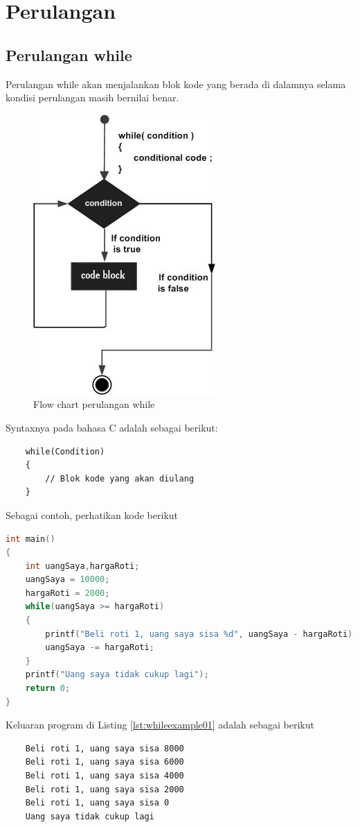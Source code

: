 \section{Perulangan}
\subsection{Perulangan while}
Perulangan while akan menjalankan blok kode yang berada di dalamnya selama kondisi perulangan masih bernilai benar.


\begin{figure}[H]
	\centering
	\includegraphics[width=0.4\linewidth]{P2/img/whileloop.png}
	\caption{Flow chart perulangan while}
	\label{fig:whileloop}
\end{figure}

Syntaxnya pada bahasa C adalah sebagai berikut:
\begin{verbatim}
    while(Condition)
    {
        // Blok kode yang akan diulang
    }
\end{verbatim}

Sebagai contoh, perhatikan kode berikut
\begin{lstlisting}[language=c,caption = Contoh Penggunaan while,label=lst:whileexample01]
int main()
{
	int uangSaya,hargaRoti;
	uangSaya = 10000;
	hargaRoti = 2000;
	while(uangSaya >= hargaRoti)
	{
	    printf("Beli roti 1, uang saya sisa %d", uangSaya - hargaRoti);
	    uangSaya -= hargaRoti;
	}
	printf("Uang saya tidak cukup lagi");
	return 0;
}
\end{lstlisting}
Keluaran program di Listing \ref{lst:whileexample01} adalah sebagai berikut
\begin{verbatim}
    Beli roti 1, uang saya sisa 8000
    Beli roti 1, uang saya sisa 6000
    Beli roti 1, uang saya sisa 4000
    Beli roti 1, uang saya sisa 2000
    Beli roti 1, uang saya sisa 0
    Uang saya tidak cukup lagi
\end{verbatim}

